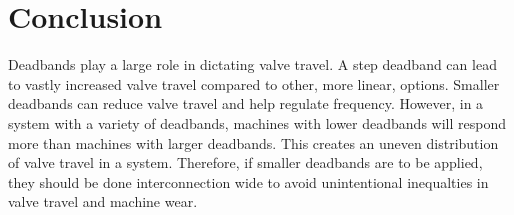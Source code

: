 \section{Conclusion}
Deadbands play a large role in dictating valve travel.
A step deadband can lead to vastly increased valve travel compared to other, more linear, options.
Smaller deadbands can reduce valve travel and help regulate frequency.
However, in a system with a variety of deadbands, machines with lower deadbands will respond more than machines with larger deadbands.
This creates an uneven distribution of valve travel in a system.
Therefore, if smaller deadbands are to be applied, they should be done interconnection wide to avoid unintentional inequalties in valve travel and machine wear.